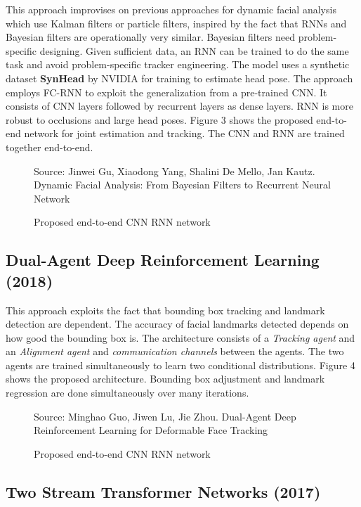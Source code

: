 \documentclass{llncs}
\begin{document}
This approach improvises on previous approaches for dynamic facial analysis which use Kalman filters or particle filters, inspired by the fact that RNNs and Bayesian filters are operationally very similar.
Bayesian filters need problem-specific designing. Given sufficient data, an RNN can be trained to do the same task and avoid problem-specific tracker engineering.
The model uses a synthetic dataset \textbf{SynHead} by NVIDIA for training to estimate head pose. The approach employs FC-RNN to exploit the generalization from a pre-trained CNN. It consists of CNN layers followed by recurrent layers as dense layers. RNN is more robust to occlusions and large head poses. Figure 3 shows the proposed end-to-end network for joint estimation and tracking. The CNN and RNN are trained together end-to-end.

\begin{figure}
%
{Source: Jinwei Gu, Xiaodong Yang, Shalini De Mello, Jan Kautz. Dynamic Facial Analysis: From Bayesian Filters to Recurrent Neural Network}
\caption{Proposed end-to-end CNN RNN network}
\end{figure}


\subsection{Dual-Agent Deep Reinforcement Learning (2018)}

This approach exploits the fact that bounding box tracking and landmark detection are dependent. The accuracy of facial landmarks detected depends on how good the bounding box is. The architecture consists of a \textit{Tracking agent} and an \textit{Alignment agent} and \textit{communication channels} between the agents. The two agents are trained simultaneously to learn two conditional distributions. Figure 4 shows the proposed architecture. Bounding box adjustment and landmark regression are done simultaneously over many iterations.

\begin{figure}
%
{Source: Minghao Guo, Jiwen Lu, Jie Zhou. Dual-Agent Deep Reinforcement Learning for Deformable Face Tracking}
\caption{Proposed end-to-end CNN RNN network}
\end{figure}

\subsection{Two Stream Transformer Networks (2017)}
\end{document}

